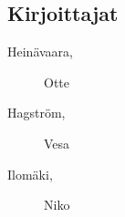 \subsection*{Kirjoittajat}
\begin{description}
\item[Heinävaara, ] Otte
\item[Hagström, ] Vesa
\item[Ilomäki, ] Niko
\end{description}
